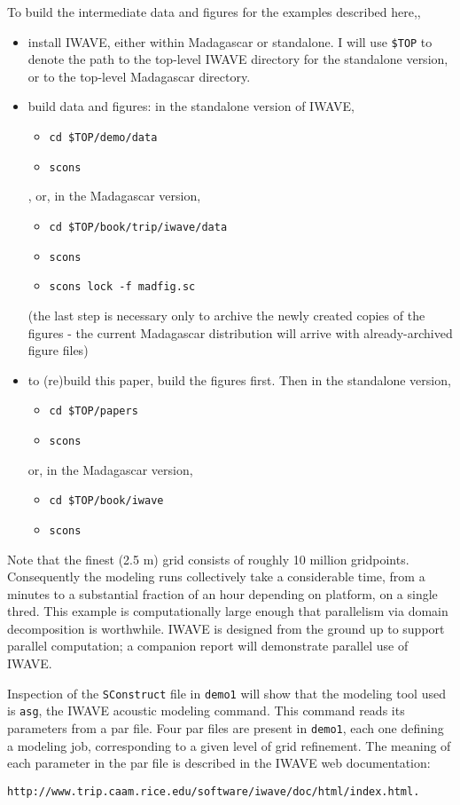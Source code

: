 To build the intermediate data and figures for  the examples described
here,,
\begin{itemize}
\item install IWAVE, either within Madagascar or standalone. I will use  {\tt \$TOP} to denote
  the path to the top-level IWAVE directory for the standalone
  version, or to the top-level Madagascar directory.
\item build data and figures: in the standalone version of IWAVE,
\begin{itemize}
  \item {\tt cd \$TOP/demo/data}
\item {\tt scons}
\end{itemize},
or, in the Madagascar version,
\begin{itemize}
\item {\tt cd \$TOP/book/trip/iwave/data}
\item {\tt scons}
\item {\tt scons lock -f madfig.sc}
\end{itemize}
(the last step is necessary only to archive the newly created copies
of the figures - the current Madagascar distribution will arrive with
already-archived figure files)
\item to (re)build this paper, build the figures first. Then in the standalone version,
\begin{itemize}
\item {\tt cd \$TOP/papers}
\item {\tt scons}
\end{itemize} 
or, in the Madagascar version,
\begin{itemize}
\item {\tt cd \$TOP/book/iwave}
\item {\tt scons}
\end{itemize}

\end{itemize}
Note that the finest (2.5 m) grid consists of roughly 10 million
gridpoints. Consequently the modeling runs collectively take a
considerable time, from a minutes to a substantial fraction of an hour
depending on platform,
on a single thred. This example is computationally large enough that
parallelism via domain decomposition is worthwhile. IWAVE is designed
from the ground up to support parallel computation; a companion report
will demonstrate parallel use of IWAVE.

Inspection of the {\tt SConstruct} file in {\tt demo1} will show that
the modeling tool used is {\tt asg}, the IWAVE
acoustic modeling command. This command reads its parameters from a
par file. Four par files are present in {\tt demo1}, each one defining
a modeling job, corresponding to a given level of grid refinement. The
meaning of each parameter in the par file is described in the IWAVE
web documentation:
\begin{verbatim}
http://www.trip.caam.rice.edu/software/iwave/doc/html/index.html.
\end{verbatim}

